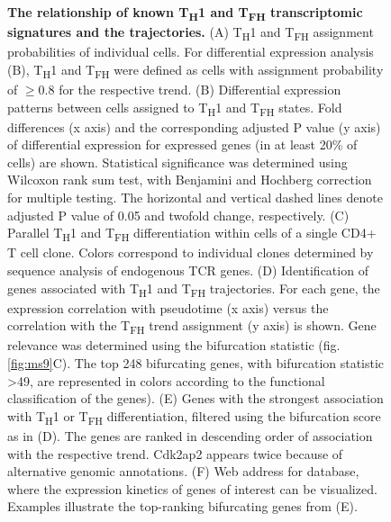 \begin{figure}
    \caption[The relationship of known T\textsubscript{H}\textnormal{1} and T\textsubscript{FH} transcriptomic signatures and the  trajectories]{\textbf{The relationship of known T\textsubscript{H}\textnormal{1} and T\textsubscript{FH} transcriptomic signatures and the  trajectories.} (A) T\textsubscript{H}\textnormal{1} and T\textsubscript{FH} assignment probabilities of individual cells. For differential expression analysis (B), T\textsubscript{H}\textnormal{1} and T\textsubscript{FH} were defined as cells with assignment probability of \( \geq 0.8 \) for the respective trend. (B) Differential expression patterns between cells assigned to T\textsubscript{H}\textnormal{1} and T\textsubscript{FH} states. Fold differences (x axis) and the corresponding adjusted P value (y axis) of differential expression for expressed genes (in at least 20\% of cells) are shown. Statistical significance was determined using Wilcoxon rank sum test, with Benjamini and Hochberg correction for multiple testing. The horizontal and vertical dashed lines denote adjusted P value of 0.05 and twofold change, respectively. (C) Parallel T\textsubscript{H}\textnormal{1} and T\textsubscript{FH} differentiation within cells of a single CD4+ T cell clone. Colors correspond to individual clones determined by sequence analysis of endogenous TCR genes. (D) Identification of genes associated with T\textsubscript{H}\textnormal{1} and T\textsubscript{FH} trajectories. For each gene, the expression correlation with pseudotime (x axis) versus the correlation with the T\textsubscript{FH} trend assignment (y axis) is shown. Gene relevance was determined using the bifurcation statistic (fig. \ref{fig:ms9}C). The top 248 bifurcating genes, with bifurcation statistic >49, are represented in colors according to the functional classification of the genes). (E) Genes with the strongest association with T\textsubscript{H}\textnormal{1} or T\textsubscript{FH} differentiation, filtered using the bifurcation score as in (D). The genes are ranked in descending order of association with the respective trend. Cdk2ap2 appears twice because of alternative genomic annotations. (F) Web address for  database, where the expression kinetics of genes of interest can be visualized. Examples illustrate the top-ranking bifurcating genes from (E).}
    \label{fig:bifurcating}
\end{figure}

